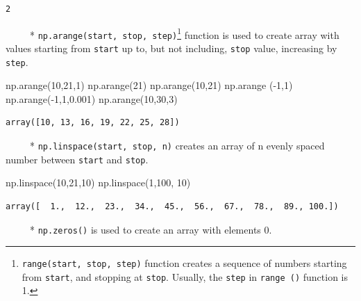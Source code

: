 \documentclass[
  letterpaper,
  DIV=11,
  numbers=noendperiod]{scrreprt}
\newenvironment{Shaded}{\begin{snugshade}}{\end{snugshade}}
\newcommand{\DecValTok}[1]{\textcolor[rgb]{0.68,0.00,0.00}{#1}}
\newcommand{\FloatTok}[1]{\textcolor[rgb]{0.68,0.00,0.00}{#1}}
\newcommand{\NormalTok}[1]{\textcolor[rgb]{0.00,0.23,0.31}{#1}}
\newcommand{\OperatorTok}[1]{\textcolor[rgb]{0.37,0.37,0.37}{#1}}
\begin{document}
\begin{verbatim}
2
\end{verbatim}

~~~~~* \texttt{np.arange(start,\ stop,\ step)}\footnote{\texttt{range(start,\ stop,\ step)}
  function creates a sequence of numbers starting from \texttt{start},
  and stopping at \texttt{stop}. Usually, the \texttt{step} in
  \texttt{range\ ()} function is 1.} function is used to create array
with values starting from \texttt{start} up to, but not including,
\texttt{stop} value, increasing by \texttt{step}.

\begin{Shaded}
\begin{Highlighting}[]
\NormalTok{np.arange(}\DecValTok{10}\NormalTok{,}\DecValTok{21}\NormalTok{,}\DecValTok{1}\NormalTok{)}
\NormalTok{np.arange(}\DecValTok{21}\NormalTok{)}
\NormalTok{np.arange(}\DecValTok{10}\NormalTok{,}\DecValTok{21}\NormalTok{)}
\NormalTok{np.arange (}\OperatorTok{{-}}\DecValTok{1}\NormalTok{,}\DecValTok{1}\NormalTok{)}
\NormalTok{np.arange(}\OperatorTok{{-}}\DecValTok{1}\NormalTok{,}\DecValTok{1}\NormalTok{,}\FloatTok{0.001}\NormalTok{)}
\NormalTok{np.arange(}\DecValTok{10}\NormalTok{,}\DecValTok{30}\NormalTok{,}\DecValTok{3}\NormalTok{)}
\end{Highlighting}
\end{Shaded}

\begin{verbatim}
array([10, 13, 16, 19, 22, 25, 28])
\end{verbatim}

~~~~~* \texttt{np.linspace(start,\ stop,\ n)} creates an array of n
evenly spaced number between \texttt{start} and \texttt{stop}.

\begin{Shaded}
\begin{Highlighting}[]
\NormalTok{np.linspace(}\DecValTok{10}\NormalTok{,}\DecValTok{21}\NormalTok{,}\DecValTok{10}\NormalTok{)}
\NormalTok{np.linspace(}\DecValTok{1}\NormalTok{,}\DecValTok{100}\NormalTok{, }\DecValTok{10}\NormalTok{)}
\end{Highlighting}
\end{Shaded}

\begin{verbatim}
array([  1.,  12.,  23.,  34.,  45.,  56.,  67.,  78.,  89., 100.])
\end{verbatim}

~~~~~* \texttt{np.zeros()} is used to create an array with elements 0.
\end{document}
